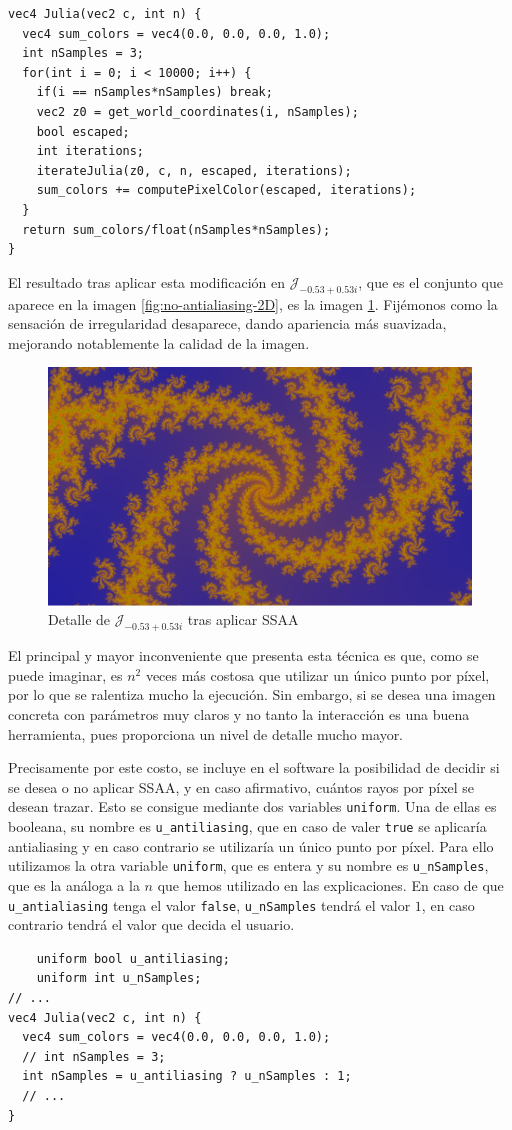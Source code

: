 \begin{lstlisting}
vec4 Julia(vec2 c, int n) {
  vec4 sum_colors = vec4(0.0, 0.0, 0.0, 1.0);
  int nSamples = 3;
  for(int i = 0; i < 10000; i++) {
    if(i == nSamples*nSamples) break;
    vec2 z0 = get_world_coordinates(i, nSamples);
    bool escaped;
    int iterations;
    iterateJulia(z0, c, n, escaped, iterations);
    sum_colors += computePixelColor(escaped, iterations);
  } 
  return sum_colors/float(nSamples*nSamples);
}
\end{lstlisting}

El resultado tras aplicar esta modificación en $\mathcal{J}_{-0.53 + 0.53i}$, que es el conjunto que aparece en la imagen \ref{fig:no-antialiasing-2D}, es la imagen \ref{fig:antiliasing-2D}. Fijémonos como la sensación de irregularidad desaparece, dando apariencia más suavizada, mejorando notablemente la calidad de la imagen.

\begin{figure} [ht]
  \centering
  \includegraphics[width=130mm]{img/C6/antialiasing.png}
  \caption{Detalle de $\mathcal{J}_{-0.53 + 0.53i}$ tras aplicar SSAA}
  \label{fig:antiliasing-2D}
\end{figure}

El principal y mayor inconveniente que presenta esta técnica es que, como se puede imaginar, es $n^2$ veces más costosa que utilizar un único punto por píxel, por lo que se ralentiza mucho la ejecución. Sin embargo, si se desea una imagen concreta con parámetros muy claros y no tanto la interacción es una buena herramienta, pues proporciona un nivel de detalle mucho mayor.

Precisamente por este costo, se incluye en el software la posibilidad de decidir si se desea o no aplicar SSAA, y en caso afirmativo, cuántos rayos por píxel se desean trazar. Esto se consigue mediante dos variables \verb|uniform|. Una de ellas es booleana, su nombre es \verb|u_antiliasing|, que en caso de valer \verb|true| se aplicaría antialiasing y en caso contrario se utilizaría un único punto por píxel. Para ello utilizamos la otra variable \verb|uniform|, que es entera y su nombre es \verb|u_nSamples|, que es la análoga a la $n$ que hemos utilizado en las explicaciones. En caso de que \verb|u_antialiasing| tenga el valor \verb|false|, \verb|u_nSamples| tendrá el valor $1$, en caso contrario tendrá el valor que decida el usuario.  

\begin{lstlisting}
    uniform bool u_antiliasing;
    uniform int u_nSamples;
// ...
vec4 Julia(vec2 c, int n) {
  vec4 sum_colors = vec4(0.0, 0.0, 0.0, 1.0);
  // int nSamples = 3;
  int nSamples = u_antiliasing ? u_nSamples : 1;
  // ... 
}
\end{lstlisting}
